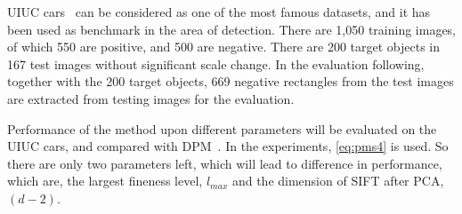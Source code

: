 UIUC cars~\citep{cds} can be considered as one of the most famous datasets, and it has been used as benchmark in the area of detection.
There are 1,050 training images, of which 550 are positive, and 500 are negative. There are 200 target objects in 167 test images without significant scale change. In the evaluation following, together with the 200 target objects, 669 negative rectangles from the test images are extracted from testing images for the evaluation.

Performance of the method upon different parameters will be evaluated on the UIUC cars, and compared with DPM~\citep{ac31}.
In the experiments, \ref{eq:pms4} is used. So there are only two parameters left, which will lead to difference in performance, which are, the largest fineness level, $l_{max}$ and the dimension of SIFT after PCA, $(d-2)$.



